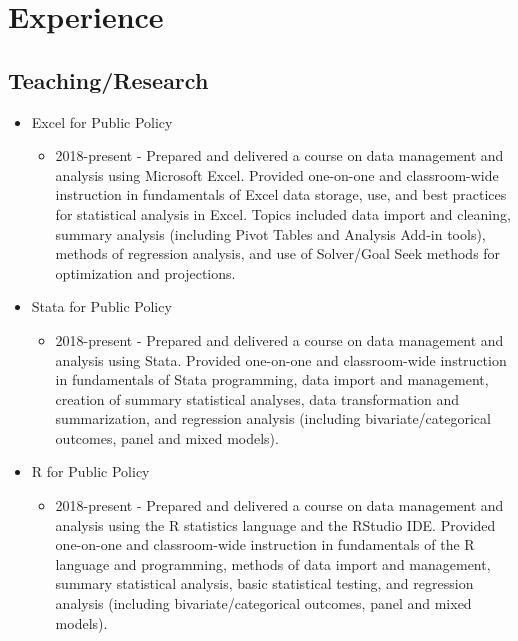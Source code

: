 \documentclass[10pt,letterpaper,unicode]{moderncv}        %
\newenvironment{mcvitemize}
{%
    \addtolength{\leftmargini}{\dimexpr\hintscolumnwidth+\separatorcolumnwidth}
    \small
    \begin{itemize}
}{%
    \end{itemize}
}
\begin{document}
\section{Experience}
\subsection{Teaching/Research}
\begin{mcvitemize}%
	\item Excel for Public Policy
		\begin{itemize}
			\item 2018-present - Prepared and delivered a course on data management and analysis using Microsoft Excel. Provided one-on-one and classroom-wide instruction in fundamentals of Excel data storage, use, and best practices for statistical analysis in Excel. Topics included data import and cleaning, summary analysis (including Pivot Tables and Analysis Add-in tools), methods of regression analysis, and use of Solver/Goal Seek methods for optimization and projections.
		\end{itemize}
	\item Stata for Public Policy
		\begin{itemize}
			\item 2018-present - Prepared and delivered a course on data management and analysis using Stata. Provided one-on-one and classroom-wide instruction in fundamentals of Stata programming, data import and management, creation of summary statistical analyses, data transformation and summarization, and regression analysis (including bivariate/categorical outcomes, panel and mixed models).
		\end{itemize}
	\item R for Public Policy
		\begin{itemize}
			\item 2018-present - Prepared and delivered a course on data management and analysis using the R statistics language and the RStudio IDE. Provided one-on-one and classroom-wide instruction in fundamentals of the R language and programming, methods of data import and management, summary statistical analysis, basic statistical testing, and regression analysis (including bivariate/categorical outcomes, panel and mixed models).

\end{itemize}
\end{mcvitemize}
\end{document}
